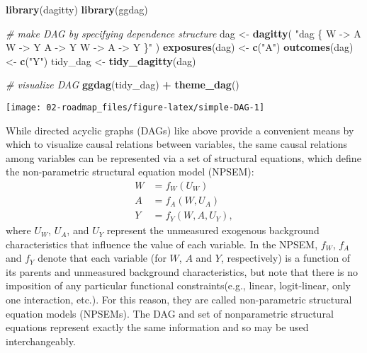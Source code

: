 \documentclass[
  12pt, krantz2,
]{book}
\makeatletter
\newenvironment{Shaded}{\begin{snugshade}}{\end{snugshade}}
\newcommand{\CommentTok}[1]{\textcolor[rgb]{0.56,0.35,0.01}{\textit{#1}}}
\newcommand{\KeywordTok}[1]{\textcolor[rgb]{0.13,0.29,0.53}{\textbf{#1}}}
\newcommand{\NormalTok}[1]{#1}
\newcommand{\OperatorTok}[1]{\textcolor[rgb]{0.81,0.36,0.00}{\textbf{#1}}}
\newcommand{\StringTok}[1]{\textcolor[rgb]{0.31,0.60,0.02}{#1}}
\newenvironment{kframe}{%
\medskip{}
\setlength{\fboxsep}{.8em}
 \def\at@end@of@kframe{}%
 \ifinner\ifhmode%
  \def\at@end@of@kframe{\end{minipage}}%
  \begin{minipage}{\columnwidth}%
 \fi\fi%
 \def\FrameCommand##1{\hskip\@totalleftmargin \hskip-\fboxsep
 \colorbox{shadecolor}{##1}\hskip-\fboxsep
     \hskip-\linewidth \hskip-\@totalleftmargin \hskip\columnwidth}%
 \MakeFramed {\advance\hsize-\width
   \@totalleftmargin\z@ \linewidth\hsize
   \@setminipage}}%
 {\par\unskip\endMakeFramed%
 \at@end@of@kframe}
\renewenvironment{Shaded}{\begin{kframe}}{\end{kframe}}
\theoremstyle{definition}
\theoremstyle{definition}
\theoremstyle{definition}
\newcommand{\1}{\mathbbm{1}}
\makeatother
\begin{document}
\begin{Shaded}
\begin{Highlighting}[]
\KeywordTok{library}\NormalTok{(dagitty)}
\KeywordTok{library}\NormalTok{(ggdag)}

\CommentTok{# make DAG by specifying dependence structure}
\NormalTok{dag <-}\StringTok{ }\KeywordTok{dagitty}\NormalTok{(}
  \StringTok{"dag \{}
\StringTok{    W -> A}
\StringTok{    W -> Y}
\StringTok{    A -> Y}
\StringTok{    W -> A -> Y}
\StringTok{  \}"}
\NormalTok{)}
\KeywordTok{exposures}\NormalTok{(dag) <-}\StringTok{ }\KeywordTok{c}\NormalTok{(}\StringTok{"A"}\NormalTok{)}
\KeywordTok{outcomes}\NormalTok{(dag) <-}\StringTok{ }\KeywordTok{c}\NormalTok{(}\StringTok{"Y"}\NormalTok{)}
\NormalTok{tidy_dag <-}\StringTok{ }\KeywordTok{tidy_dagitty}\NormalTok{(dag)}

\CommentTok{# visualize DAG}
\KeywordTok{ggdag}\NormalTok{(tidy_dag) }\OperatorTok{+}
\StringTok{  }\KeywordTok{theme_dag}\NormalTok{()}
\end{Highlighting}
\end{Shaded}

\begin{center}\texttt{[image: 02-roadmap\_files/figure-latex/simple-DAG-1]} \end{center}

While directed acyclic graphs (DAGs) like above provide a convenient means by
which to visualize causal relations between variables, the same causal relations
among variables can be represented via a set of structural equations, which
define the non-parametric structural equation model (NPSEM):
\begin{align*}
  W &= f_W(U_W) \\
  A &= f_A(W, U_A) \\
  Y &= f_Y(W, A, U_Y),
\end{align*}
where \(U_W\), \(U_A\), and \(U_Y\) represent the unmeasured exogenous background
characteristics that influence the value of each variable. In the NPSEM, \(f_W\),
\(f_A\) and \(f_Y\) denote that each variable (for \(W\), \(A\) and \(Y\), respectively)
is a function of its parents and unmeasured background characteristics, but note
that there is no imposition of any particular functional constraints(e.g.,
linear, logit-linear, only one interaction, etc.). For this reason, they are
called non-parametric structural equation models (NPSEMs). The DAG and set of
nonparametric structural equations represent exactly the same information and so
may be used interchangeably.
\end{document}
